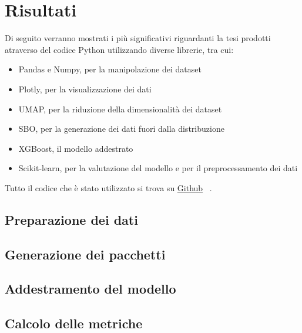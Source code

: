 \chapter{Risultati}

Di seguito verranno mostrati i più significativi riguardanti la tesi prodotti atraverso del codice Python utilizzando diverse librerie, tra cui:

\begin{itemize}
    \item Pandas e Numpy, per la manipolazione dei dataset
    \item Plotly, per la visualizzazione dei dati
    \item UMAP, per la riduzione della dimensionalità dei dataset 
    \item SBO, per la generazione dei dati fuori dalla distribuzione
    \item XGBoost, il modello addestrato
    \item Scikit-learn, per la valutazione del modello e per il preprocessamento dei dati
\end{itemize}

Tutto il codice che è stato utilizzato si trova su \href{https://github.com/guglielmobartelloni/thesis-utils}{Github}~\cite{github} .

\section{Preparazione dei dati}

\section{Generazione dei pacchetti}

\section{Addestramento del modello}

\section{Calcolo delle metriche}


